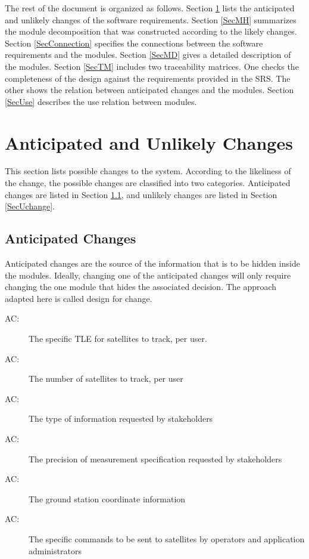 \documentclass[12pt, titlepage]{article}
\newcounter{acnum}
\newcommand{\actheacnum}{AC\theacnum}
\begin{document}
The rest of the document is organized as follows. Section
\ref{SecChange} lists the anticipated and unlikely changes of the software
requirements. Section \ref{SecMH} summarizes the module decomposition that
was constructed according to the likely changes. Section \ref{SecConnection}
specifies the connections between the software requirements and the
modules. Section \ref{SecMD} gives a detailed description of the
modules. Section \ref{SecTM} includes two traceability matrices. One checks
the completeness of the design against the requirements provided in the SRS. The
other shows the relation between anticipated changes and the modules. Section
\ref{SecUse} describes the use relation between modules.

\section{Anticipated and Unlikely Changes} \label{SecChange}

This section lists possible changes to the system. According to the likeliness
of the change, the possible changes are classified into two
categories. Anticipated changes are listed in Section \ref{SecAchange}, and
unlikely changes are listed in Section \ref{SecUchange}.

\subsection{Anticipated Changes} \label{SecAchange}

Anticipated changes are the source of the information that is to be hidden
inside the modules. Ideally, changing one of the anticipated changes will only
require changing the one module that hides the associated decision. The approach
adapted here is called design for
change.

\begin{description}
\item[ \actheacnum \label{acHardware}:] The specific TLE for satellites to track, per user.
\item[ \actheacnum \label{acInput}:] The number of satellites to track, per user
\item[ \actheacnum \label{acInput}:] The type of information requested by stakeholders 
\item[ \actheacnum \label{acInput}:] The precision of measurement specification requested by stakeholders 
\item[ \actheacnum \label{acInput}:] The ground station coordinate information 
\item[ \actheacnum \label{acInput}:] The specific commands to be sent to satellites by operators and application administrators 
\end{description}
\end{document}
